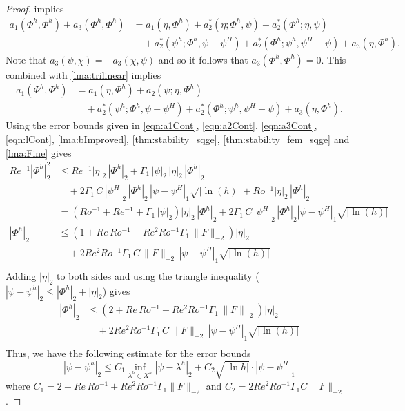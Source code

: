 \begin{proof}
  implies
  \begin{equation*}
    \begin{split}
      a_1(\Phi^h,\Phi^h) + a_3(\Phi^h,\Phi^h) &= a_1(\eta,\Phi^h)
        + a_2^*(\eta;\Phi^h, \psi) - a_2^*(\Phi^h;\eta,\psi) \\
      &\quad+ a_2^*(\psi^h;\Phi^h,\psi-\psi^H) + a_2^*(\Phi^h; \psi^h,\psi^H-\psi)
        + a_3(\eta,\Phi^h).
    \end{split}
  \end{equation*}
  Note that $a_3(\psi,\chi) = -a_3(\chi,\psi)$ and so it follows that $a_3(\Phi^h,\Phi^h) = 0$. This combined with
  \autoref{lma:trilinear} implies
  \begin{equation*}
    \begin{split}
      a_1(\Phi^h,\Phi^h) &= a_1(\eta,\Phi^h) + a_2(\psi;\eta,\Phi^h) \\
      &\quad+ a_2^*(\psi^h;\Phi^h,\psi-\psi^H) + a_2^*(\Phi^h; \psi^h,\psi^H-\psi)
        + a_3(\eta,\Phi^h).
    \end{split}
  \end{equation*}
  Using the error bounds given in \eqref{eqn:a1Cont}, \eqref{eqn:a2Cont}, \eqref{eqn:a3Cont},
  \eqref{eqn:lCont}, \autoref{lma:bImproved}, \autoref{thm:stability_sqge},
  \autoref{thm:stability_fem_sqge} and \autoref{lma:Fine} gives
  \begin{align*}
    Re^{-1} |\Phi^h|_2^2 &\le Re^{-1} |\eta|_2\, |\Phi^h|_2 + \Gamma_1\, |\psi|_2\, |\eta|_2\, |\Phi^h|_2 \\
      &\quad+ 2 \Gamma_1\, C\, |\psi^H|_2\, |\Phi^h|_2\, |\psi - \psi^H|_1 \sqrt{|\ln(h)|} + Ro^{-1}
        |\eta|_2\, |\Phi^h|_2 \\
    &= \left(Ro^{-1} + Re^{-1} + \Gamma_1\, |\psi|_2\right) |\eta|_2\, |\Phi^h|_2 + 2 \Gamma_1\, C\,
      |\psi^H|_2\, |\Phi^h|_2 |\psi - \psi^H|_1 \sqrt{|\ln(h)|}  \\
    |\Phi^h|_2 &\le \left(1 + Re\, Ro^{-1} + Re^2 Ro^{-1} \Gamma_1\, \|F\|_{-2}\right) |\eta|_2 \\
      &\quad + 2 Re^2 Ro^{-1} \Gamma_1\, C\, \|F\|_{-2}\, |\psi - \psi^H|_1 \sqrt{|\ln(h)|} \\
  \end{align*}
  Adding $|\eta|_2$ to both sides and using the triangle inequality ($|\psi - \psi^h|_2 \le |\Phi^h|_2 + |\eta|_2$) gives
  \begin{align*}
    |\Phi^h|_2 &\le \left(2 + Re\, Ro^{-1} + Re^2 Ro^{-1} \Gamma_1\, \|F\|_{-2}\right) |\eta|_2 \\
      &\quad + 2 Re^2 Ro^{-1} \Gamma_1\, C\, \|F\|_{-2}\, |\psi - \psi^H|_1 \sqrt{|\ln(h)|} \\
  \end{align*}
  Thus, we have the following estimate for the error bounds
  \begin{equation*}
    |\psi-\psi^h|_2 \le C_1 \inf_{\lambda^h\in X^h} |\psi-\lambda^h|_2 + C_2 \sqrt{|\ln h|}\cdot |\psi -
      \psi^H|_1
  \end{equation*}
  where $C_1 = 2 + Re\,Ro^{-1} + Re^2 Ro^{-1} \Gamma_1 \|F\|_{-2}$ and $C_2= 2 Re^2 Ro^{-1} \Gamma_1
  C\,\|F\|_{-2}$.
\end{proof}

